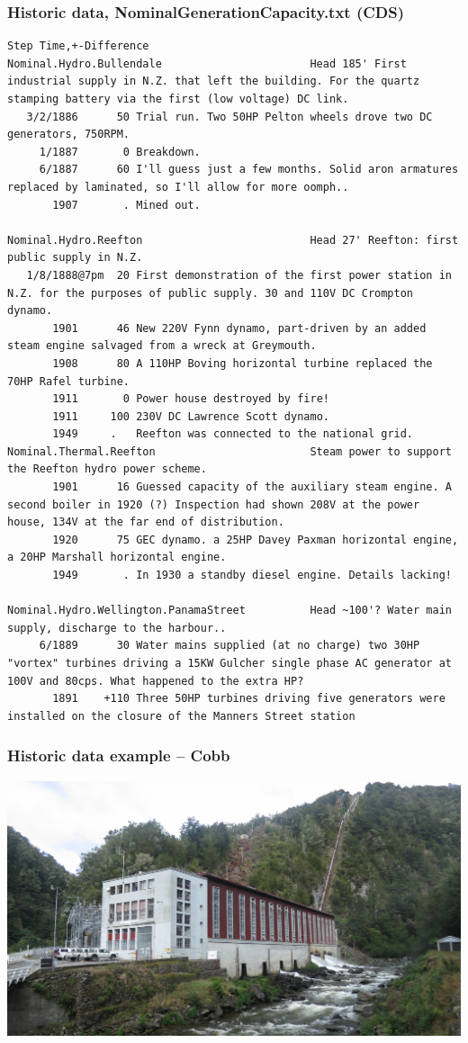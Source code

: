 \documentclass[aspectratio=169]{beamer}
\begin{document}
\begin{frame}[fragile]
  \frametitle{Historic data, NominalGenerationCapacity.txt (CDS)}
  \scriptsize
  \begin{verbatim}
Step Time,+-Difference
Nominal.Hydro.Bullendale                       Head 185' First industrial supply in N.Z. that left the building. For the quartz stamping battery via the first (low voltage) DC link.
   3/2/1886      50 Trial run. Two 50HP Pelton wheels drove two DC generators, 750RPM.
     1/1887       0 Breakdown.
     6/1887      60 I'll guess just a few months. Solid aron armatures replaced by laminated, so I'll allow for more oomph..
       1907       . Mined out.

Nominal.Hydro.Reefton                          Head 27' Reefton: first public supply in N.Z.
   1/8/1888@7pm  20 First demonstration of the first power station in N.Z. for the purposes of public supply. 30 and 110V DC Crompton dynamo.
       1901      46 New 220V Fynn dynamo, part-driven by an added steam engine salvaged from a wreck at Greymouth.
       1908      80 A 110HP Boving horizontal turbine replaced the 70HP Rafel turbine.
       1911       0 Power house destroyed by fire!
       1911     100 230V DC Lawrence Scott dynamo.
       1949     .   Reefton was connected to the national grid.
Nominal.Thermal.Reefton                        Steam power to support the Reefton hydro power scheme.
       1901      16 Guessed capacity of the auxiliary steam engine. A second boiler in 1920 (?) Inspection had shown 208V at the power house, 134V at the far end of distribution.
       1920      75 GEC dynamo. a 25HP Davey Paxman horizontal engine, a 20HP Marshall horizontal engine.
       1949       . In 1930 a standby diesel engine. Details lacking!

Nominal.Hydro.Wellington.PanamaStreet          Head ~100'? Water main supply, discharge to the harbour..
     6/1889      30 Water mains supplied (at no charge) two 30HP "vortex" turbines driving a 15KW Gulcher single phase AC generator at 100V and 80cps. What happened to the extra HP?
       1891    +110 Three 50HP turbines driving five generators were installed on the closure of the Manners Street station

  \end{verbatim}
\end{frame}


\frame
{\frametitle{Historic data example -- Cobb}
\begin{center}
\includegraphics[height=7.5cm]{cobb.jpg} 
\end{center}
}
\end{document}
